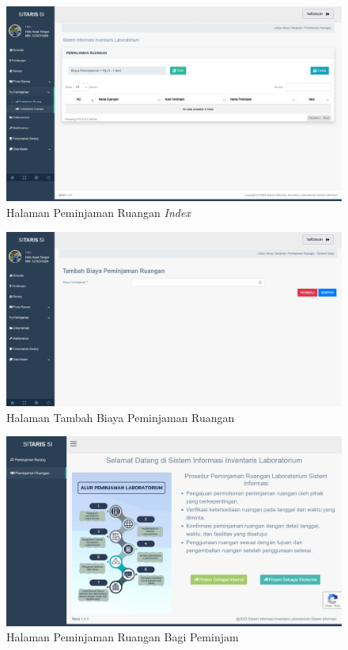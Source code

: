 \begin{enumerate}
        \begin{figure}
          \centering
          \includegraphics[width=0.82\linewidth]{konten//gambar/peminjaman ruangan index.png}
          \caption{Halaman Peminjaman Ruangan \textit{Index}}
          \label{fig:enter-label}
        \end{figure}

        \begin{figure}
          \centering
          \includegraphics[width=0.82\linewidth]{konten//gambar/tambah biaya peminjaman ruangan.png}
          \caption{Halaman Tambah Biaya Peminjaman Ruangan}
          \label{fig:enter-label}
        \end{figure}

        \begin{figure}
          \centering
          \includegraphics[width=0.82\linewidth]{konten//gambar/peminjaman ruangan peminjam.png}
          \caption{Halaman Peminjaman Ruangan Bagi Peminjam}
          \label{fig:enter-label}
        \end{figure}


\end{enumerate}

